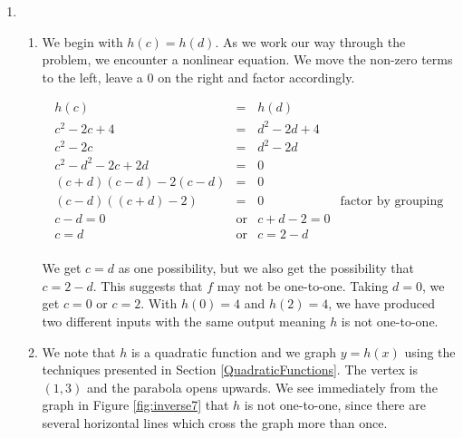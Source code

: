 {\begin{enumerate}
\begin{enumerate}
\item  We can graph $g$ using the six step procedure outlined in Section \ref{RationalGraphs}.  We get the sole intercept at $(0,0)$, a vertical asymptote $x=1$ and a horizontal asymptote (which the graph never crosses) $y = -2$. We see from that the graph of $g$ in Figure \ref{fig:inverse6} that $g$ passes the Horizontal Line Test.

\end{enumerate}


\item  \begin{enumerate} \item  We begin with $h(c) = h(d)$.  As we work our way through the problem, we encounter a nonlinear equation.  We move the non-zero terms to the left, leave a $0$ on the right and factor accordingly.

\[ \begin{array}{rclr}

h(c) & = & h(d) & \\
c^2 - 2c+4 & = & d^2 - 2d+4 & \\

c^2 - 2c & = & d^2 - 2d & \\

c^2 - d^2 - 2c + 2d & = & 0 & \\

(c+d)(c-d) - 2(c-d) & = & 0 & \\

(c-d)((c+d) -2) & = & 0 & \mbox{factor by grouping} \\

c-d = 0 & \mbox{or} & c+d -2 = 0 & \\

c = d & \mbox{or} & c = 2-d & \\

\end{array} \]

We get $c=d$ as one possibility, but we also get the possibility that $c=2-d$.  This suggests that $f$ may not be one-to-one.  Taking $d=0$, we get $c = 0$ or $c = 2$.  With $h(0) = 4$ and $h(2) = 4$, we have produced two different inputs with the same output meaning $h$ is not one-to-one.

\item  We note that $h$ is a quadratic function and we graph $y=h(x)$ using the techniques presented in Section \ref{QuadraticFunctions}.  The vertex is $(1,3)$ and the parabola opens upwards.  We see immediately from the graph in Figure \ref{fig:inverse7} that $h$ is not one-to-one, since there are several horizontal lines which cross the graph more than once.


\end{enumerate}
\end{enumerate}}
